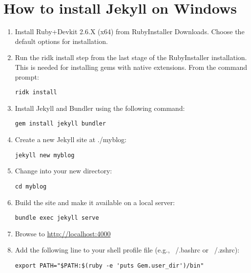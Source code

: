 \documentclass{book}
\begin{document}
\section*{How to install Jekyll on Windows}
\begin{enumerate}
\item Install Ruby+Devkit 2.6.X (x64) from RubyInstaller Downloads. Choose the default options for installation.
\item Run the ridk install step from the last stage of the RubyInstaller installation. This is needed for installing gems with native extensions. From the command prompt:
 \begin{verbatim}ridk install
\end{verbatim}  
\item Install Jekyll and Bundler using the following command:
 \begin{verbatim}gem install jekyll bundler
\end{verbatim}
\item Create a new Jekyll site at ./myblog:
 \begin{verbatim}jekyll new myblog
\end{verbatim}
\item Change into your new directory:
 \begin{verbatim}cd myblog
\end{verbatim}
\item Build the site and make it available on a local server:
 \begin{verbatim}bundle exec jekyll serve
\end{verbatim}
\item Browse to \url{http://localhost:4000}
\item Add the following line to your shell profile file (e.g., ~/.bashrc or ~/.zshrc):
 \begin{verbatim}export PATH="$PATH:$(ruby -e 'puts Gem.user_dir')/bin"
\end{verbatim}
\end{enumerate}
\end{document}
